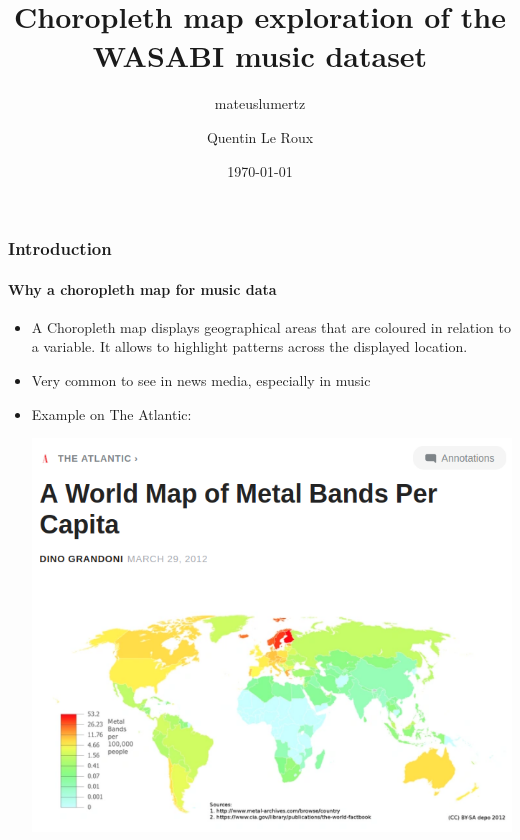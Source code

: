 \documentclass[aspectratio=43,10pt]{beamer}
\author{mateuslumertz}
\title[Choropleth map on WASABI]{Choropleth map exploration of the WASABI music dataset}
\author{Quentin Le Roux}
\date{\today}
\begin{document}
\begin{frame}[plain]
\maketitle
\end{frame}

\begin{frame}
    \frametitle{Introduction}
    \framesubtitle{Why a choropleth map for music data}
    
    \begin{itemize}
        \item A Choropleth map displays geographical areas that are coloured in relation to a variable. It allows to highlight patterns across the displayed location.
        \item Very common to see in news media, especially in music
        \item Example on The Atlantic:
        \begin{center}
            \includegraphics[width=0.6\linewidth]{imagens/atlantic_article.png}
        \end{center}
    \end{itemize}
\end{frame}
\end{document}
